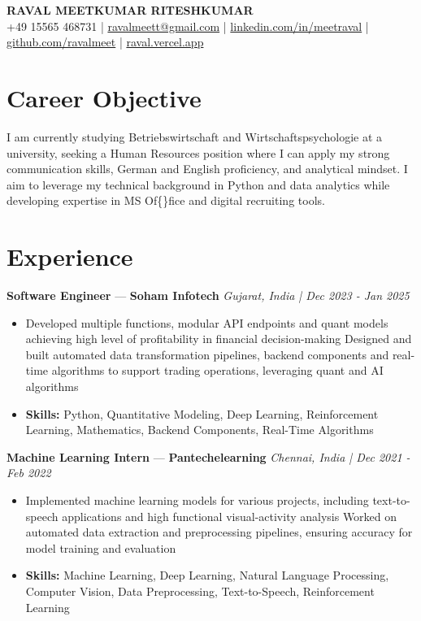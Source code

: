 \documentclass[a4paper,10pt]{article}
\begin{document}
\begin{center}
  {\Large\bfseries RAVAL MEETKUMAR RITESHKUMAR}\\[2pt]
  {\small +49 15565 468731 \;|\; \href{mailto:ravalmeett@gmail.com}{ravalmeett@gmail.com} \;|\; \href{https://www.linkedin.com/in/meetraval/}{linkedin.com/in/meetraval} \;|\; \href{https://github.com/ravalmeet}{github.com/ravalmeet} \;|\; \href{https://raval.vercel.app/}{raval.vercel.app}}
\end{center}
\vspace{-3pt}

\section*{Career Objective}
I am currently studying Betriebswirtschaft and Wirtschaftspsychologie at a university, seeking a Human Resources position where I can apply my strong communication skills, German and English proficiency, and analytical mindset. I aim to leverage my technical background in Python and data analytics while developing expertise in MS Of\{\}fice and digital recruiting tools.\par

\section*{Experience}
\textbf{Software Engineer} — \textbf{Soham Infotech} \hfill \textit{Gujarat, India \;|\; Dec 2023 - Jan 2025}\par
\vspace{1pt}
\begin{itemize}
  \item Developed multiple functions, modular API endpoints and quant models achieving high level of profitability in financial decision-making Designed and built automated data transformation pipelines, backend components and real-time algorithms to support trading operations, leveraging quant and AI algorithms
  \item \textbf{Skills:} Python, Quantitative Modeling, Deep Learning, Reinforcement Learning, Mathematics, Backend Components, Real-Time Algorithms
\end{itemize}
\vspace{3pt}
\textbf{Machine Learning Intern} — \textbf{Pantechelearning} \hfill \textit{Chennai, India \;|\; Dec 2021 - Feb 2022}\par
\vspace{1pt}
\begin{itemize}
  \item Implemented machine learning models for various projects, including text-to-speech applications and high functional visual-activity analysis Worked on automated data extraction and preprocessing pipelines, ensuring accuracy for model training and evaluation
  \item \textbf{Skills:} Machine Learning, Deep Learning, Natural Language Processing, Computer Vision, Data Preprocessing, Text-to-Speech, Reinforcement Learning
\end{itemize}
\end{document}
